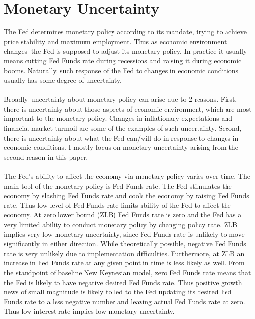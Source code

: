 \documentclass[12pt]{article}
\begin{document}
\section{Monetary Uncertainty} \label{sec:Model}

The Fed determines monetary policy according to its mandate, trying to achieve price stability and maximum employment. Thus as economic environment changes, the Fed is supposed to adjust its monetary policy. In practice it usually means cutting Fed Funds rate during recessions and raising it during economic booms. Naturally, such response of the Fed to changes in economic conditions usually has some degree of uncertainty. 
\paragraph{}
Broadly, uncertainty about monetary policy can arise due to 2 reasons. First, there is uncertainty about those aspects of economic environment, which are most important to the monetary policy. Changes in inflationary expectations and financial market turmoil are some of the examples of such uncertainty. Second, there is uncertainty about what the Fed can/will do in response to changes in economic conditions. I mostly focus on monetary uncertainty arising from the second reason in this paper.
\paragraph{}
The Fed's ability to affect the economy via monetary policy varies over time. The main tool of the monetary policy is Fed Funds rate. The Fed stimulates the economy by slashing Fed Funds rate and cools the economy by raising Fed Funds rate. Thus low level of Fed Funds rate limits ability of the Fed to affect the economy. At zero lower bound (ZLB) Fed Funds rate is zero and the Fed has a very limited ability to conduct monetary policy by changing policy rate. ZLB implies very low monetary uncertainty, since Fed Funds rate is unlikely to move significantly in either direction. While theoretically possible, negative Fed Funds rate is very unlikely due to implementation difficulties. Furthermore, at ZLB an increase in Fed Funds rate at any given point in time is less likely as well. From the standpoint of baseline New Keynesian model, zero Fed Funds rate means that the Fed is likely to have negative desired Fed Funds rate. Thus positive growth news of small magnitude is likely to led to the Fed updating its desired Fed Funds rate to a less negative number and leaving actual Fed Funds rate at zero. Thus low interest rate implies low monetary uncertainty.
\end{document}
